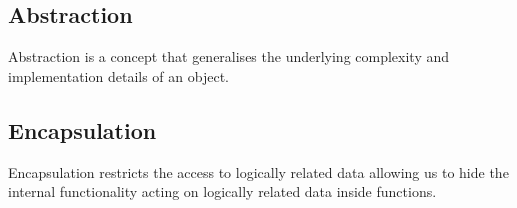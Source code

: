 \documentclass{article}
\begin{document}
\subsection{Abstraction}
Abstraction is a concept that generalises the underlying complexity 
and implementation details of an object.
\subsection{Encapsulation}
Encapsulation restricts the access to logically related data 
allowing us to hide the internal \linebreak functionality acting on logically 
related data inside functions.
\end{document}
